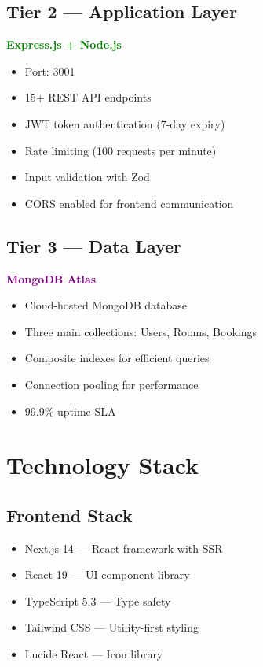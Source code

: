 \documentclass[12pt, a4paper, oneside]{report}
\begin{document}
\subsection{Tier 2 --- Application Layer}
\textcolor{Green}{\textbf{Express.js + Node.js}}
\begin{itemize}
  \item Port: 3001
  \item 15+ REST API endpoints
  \item JWT token authentication (7-day expiry)
  \item Rate limiting (100 requests per minute)
  \item Input validation with Zod
  \item CORS enabled for frontend communication
\end{itemize}

\subsection{Tier 3 --- Data Layer}
\textcolor{Purple}{\textbf{MongoDB Atlas}}
\begin{itemize}
  \item Cloud-hosted MongoDB database
  \item Three main collections: Users, Rooms, Bookings
  \item Composite indexes for efficient queries
  \item Connection pooling for performance
  \item 99.9\% uptime SLA
\end{itemize}

\section{Technology Stack}

\subsection{Frontend Stack}
\begin{itemize}
  \item Next.js 14 --- React framework with SSR
  \item React 19 --- UI component library
  \item TypeScript 5.3 --- Type safety
  \item Tailwind CSS --- Utility-first styling
  \item Lucide React --- Icon library
\end{itemize}
\end{document}
